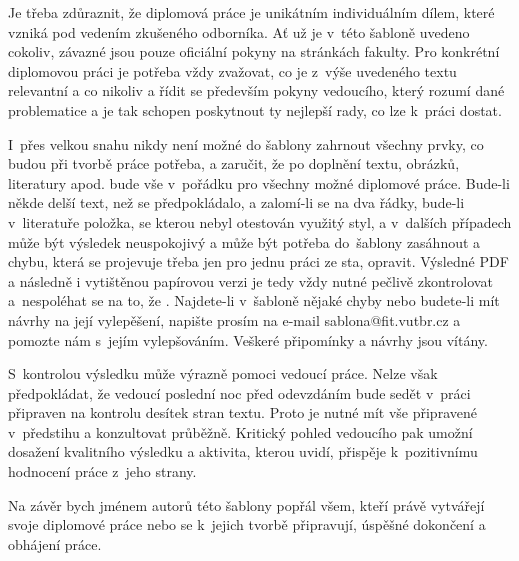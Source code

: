 Je třeba zdůraznit, že diplomová práce je unikátním individuálním dílem, které vzniká pod vedením zkušeného odborníka. Ať už je v~této šabloně uvedeno cokoliv, závazné jsou pouze oficiální pokyny na stránkách fakulty. Pro konkrétní diplomovou práci je potřeba vždy zvažovat, co je z~výše uvedeného textu relevantní a co nikoliv a řídit se především pokyny vedoucího, který rozumí dané problematice a je tak schopen poskytnout ty nejlepší rady, co lze k~práci dostat.

I~přes velkou snahu nikdy není možné do šablony zahrnout všechny prvky, co budou při tvorbě práce potřeba, a zaručit, že po doplnění textu, obrázků, literatury apod. bude vše v~pořádku pro všechny možné diplomové práce. Bude-li někde delší text, než se předpokládalo, a zalomí-li se na dva řádky, bude-li v~literatuře položka, se kterou nebyl otestován využitý styl, a v~dalších případech může být výsledek neuspokojivý a může být potřeba do~šablony zasáhnout a chybu, která se projevuje třeba jen pro jednu práci ze sta, opravit. Výsledné PDF a následně i vytištěnou papírovou verzi je tedy vždy nutné pečlivě zkontrolovat a~nespoléhat se na to, že . Najdete-li v~šabloně nějaké chyby nebo budete-li mít návrhy na její vylepěšení, napište prosím na e-mail sablona@fit.vutbr.cz a pomozte nám s~jejím vylepšováním. Veškeré připomínky a návrhy jsou vítány.

S~kontrolou výsledku může výrazně pomoci vedoucí práce. Nelze však předpokládat, že vedoucí poslední noc před odevzdáním bude sedět v~práci připraven na kontrolu desítek stran textu. Proto je nutné mít vše připravené v~předstihu a konzultovat průběžně. Kritický pohled vedoucího pak umožní dosažení kvalitního výsledku a aktivita, kterou uvidí, přispěje k~pozitivnímu hodnocení práce z~jeho strany.

Na závěr bych jménem autorů této šablony popřál všem, kteří právě vytvářejí svoje diplomové práce nebo se k~jejich tvorbě připravují, úspěšné dokončení a obhájení práce.






